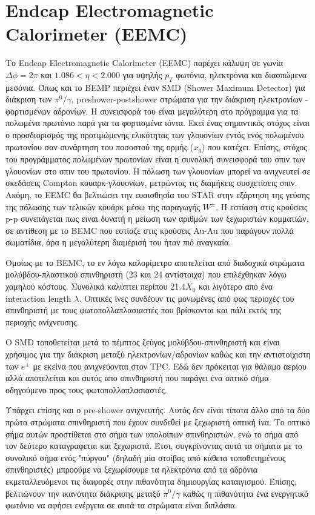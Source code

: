 \section{Endcap Electromagnetic Calorimeter (EEMC)}

	Το Endcap Electromagnetic Calorimeter (EEMC) παρέχει κάλυψη σε γωνία $\Delta\phi=2\pi$ και $1.086<\eta<2.000$ για υψηλής $p_T$ φωτόνια, ηλεκτρόνια και διασπώμενα μεσόνια. 
	Όπως και το BEMP περιέχει έναν SMD (Shower Maximum Detector) για διάκριση των $\pi^0/\gamma$, preshower-postshower στρώματα για την διάκριση ηλεκτρονίων - φορτισμένων αδρονίων. Η συνεισφορά του είναι μεγαλύτερη στο πρόγραμμα για τα πολωμένα πρωτόνιο παρά για τα φορτισμένα ιόντα. Εκεί ένας σημαντικός στόχος είναι ο προσδιορισμός της προτιμώμενης ελικότητας των γλουονίων εντός ενός πολωμένου πρωτονίου σαν συνάρτηση του ποσοστού της ορμής ($x_g$) που κατέχει. Επίσης, στόχος του προγράμματος πολωμένων πρωτονίων είναι η συνολική συνεισφορά του σπιν των γλουονίων στο σπιν του πρωτονίου.
	Η πόλωση των γλουονίων μπορεί να ανιχνευτεί σε σκεδάσεις Compton κουαρκ-γλουονίων, μετρώντας τις διαμήκεις συσχετίσεις σπιν. 
	Ακόμη, το EEMC θα βελτιώσει την ευαισθησία του STAR στην εξάρτηση της γεύσης της πόλωσης των τελικών κουάρκ μέσω της παραγωγής $W^{\pm}$.	
	H εστίαση στις κρούσεις p-p συνεπάγεται πως ειναι δυνατή η μείωση των αριθμών των ξεχωριστών κομματιών, σε αντίθεση με το BEMC που εστίαζε στις κρούσεις Au-Au που παράγουν πολλά σωματίδια, άρα η μεγαλύτερη διαμέρισή του ήταν πιό αναγκαία.  
	
	Ομοίως με το BEMC, το εν λόγω καλορίμετρο αποτελείται από διαδοχικά στρώματα μολύβδου-πλαστικού σπινθηριστή (23 και 24 αντίστοιχα) που επιλέχθηκαν λόγω χαμηλού κόστους. Συνολικά καλύπτει περίπου 21.4$X_0$ και λιγότερο από ένα interaction length $\lambda$.
	Οπτικές ίνες συνδέουν τις μονωμένες από φως περιοχές του σπινθηριστή με τους φωτοπολλαπλασιαστές που βρίσκονται και πάλι εκτός της περιοχής ανίχνευσης.
	
	Ο SMD τοποθετείται μετά το πέμπτος ζεύγος μολύβδου-σπινθηριστή και είναι χρήσιμος για την διάκριση μεταξύ ηλεκτρονίων/αδρονίων καθώς και την αντιστοίχιστη των $e^\pm$ με εκείνα που ανιχνεύονται στον TPC. Εδώ δεν πρόκειται για θάλαμο αερίου αλλά αποτελείται και αυτός απο σπινθηριστή που παράγει ένα οπτικό σήμα οδηγούμενο προς τους φωτοπολλαπλασιαστές.
	
	Υπάρχει επίσης και ο pre-shower ανιχνευτής. Αυτός δεν είναι τίποτα άλλο από τα δύο πρώτα στρώματα σπινθηριστή που έχουν συνδεθεί με ξεχωριστή οπτική ίνα. Το οπτικό σήμα αυτών προστίθεται στο σήμα των υπολοίπων σπινθηριστών, ενώ το σήμα από τον δεύτερο καταγραφεται και ξεχωριστά. Έτσι, συγκρίνοντας αυτά τα σήματα με το συνολικό σήμα ενός "πύργου" (δηλαδή μία στοίβας από κάθετα τοποθετημένους σπινθηριστές) μπροούμε να ξεχωρίσουμε τα ηλεκτρόνια από τα αδρόνια εκμεταλλευόμενοι τις διαφορές στην πιθανότητα δημιουργίας καταιγισμού.
	Έπίσης, βελτιώνουν την ικανότητα διάκρισης μεταξύ $\pi^0/\gamma$ καθώς η πιθανότητα ένα ενεργητικό φωτόνιο να αφήσει ενέργεια σε αυτά τα στρώματα είναι διπλάσια.
	
	